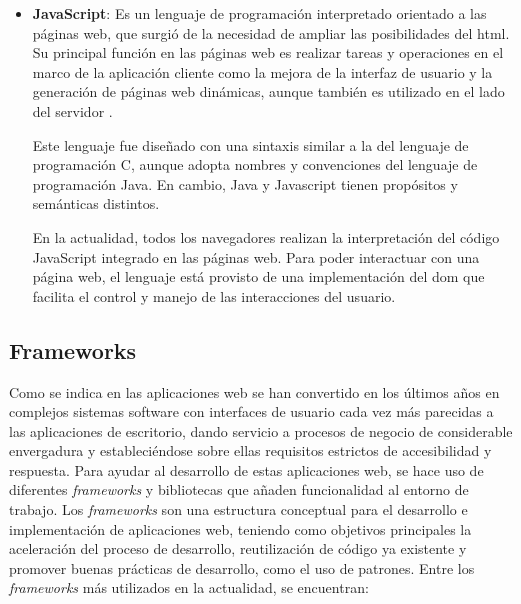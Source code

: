 \begin{itemize}
\item \textbf{JavaScript}: Es un lenguaje de programación interpretado orientado a las páginas web, que surgió de la necesidad de ampliar las posibilidades del \acrshort{html}. Su principal función en las páginas web es realizar tareas y operaciones en el marco de la aplicación cliente como la mejora de la interfaz de usuario y la generación de páginas web dinámicas, aunque también es utilizado en el lado del servidor .

Este lenguaje fue diseñado con una sintaxis similar a la del lenguaje de programación C, aunque adopta nombres y convenciones del lenguaje de programación Java. En cambio, Java y Javascript tienen propósitos y semánticas distintos.

En la actualidad, todos los navegadores realizan la interpretación del código JavaScript integrado en las páginas web. Para poder interactuar con una página web, el lenguaje está provisto de una implementación del \acrfull{dom} que facilita el control y manejo de las interacciones del usuario.

\end{itemize}

\subsection{Frameworks}
\label{sec:frameworks}

Como se indica en \cite{garrido2004arquitectura} las aplicaciones web se han convertido en los últimos años en complejos sistemas \gls{software} con interfaces de usuario cada vez más parecidas a las aplicaciones de escritorio, dando servicio a procesos de negocio de considerable envergadura y estableciéndose sobre ellas requisitos estrictos de accesibilidad y respuesta. Para ayudar al desarrollo de estas aplicaciones web, se hace uso de diferentes \emph{frameworks} y bibliotecas que añaden funcionalidad al entorno de trabajo. Los \emph{frameworks} son una estructura conceptual para el desarrollo e implementación de aplicaciones web, teniendo como objetivos principales la aceleración del proceso de desarrollo, reutilización de código ya existente y promover buenas prácticas de desarrollo, como el uso de patrones. Entre los \emph{frameworks} más utilizados en la actualidad, se encuentran:

